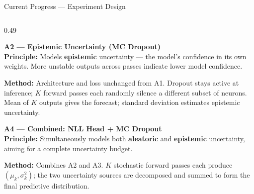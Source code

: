 \documentclass[10pt]{beamer}
\begin{document}
\begin{frame}[shrink=8]{Current Progress — Experiment Design}
\begin{columns}[t]
\begin{column}{0.49\textwidth}
    \begin{block}{\footnotesize\textbf{A2 — Epistemic Uncertainty (MC Dropout)}}
      \scriptsize
      ~\\
      \textbf{Principle:} Models \textbf{epistemic} uncertainty --- the
      model's confidence in its own weights. More unstable outputs across
      passes indicate lower model confidence.
      \par\vspace{4pt}
      \textbf{Method:} Architecture and loss unchanged from A1.
      Dropout stays active at inference; $K$ forward passes each randomly
      silence a different subset of neurons. Mean of $K$ outputs gives
      the forecast; standard deviation estimates epistemic uncertainty.
    \end{block}

    \vspace{0.4em}

    \begin{block}{\footnotesize\textbf{A4 — Combined: NLL Head + MC Dropout}}
      \scriptsize
      ~\\
      \textbf{Principle:} Simultaneously models both \textbf{aleatoric}
      and \textbf{epistemic} uncertainty, aiming for a complete
      uncertainty budget.
      \par\vspace{4pt}
      \textbf{Method:} Combines A2 and A3. $K$ stochastic forward passes
      each produce $(\mu_k, \sigma^2_k)$; the two uncertainty sources
      are decomposed and summed to form the final predictive distribution.
    \end{block}

  \end{column}

\end{columns}
\end{frame}
\end{document}
